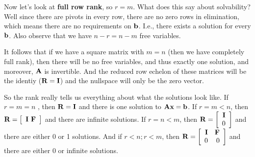 Now let's look at \textbf{full row rank}, so $r = m$. What does this say about solvability? Well since there are pivots in every row, there are no zero rows in elimination, which means there are no requirements on $\vb$. I.e., there exists a solution for every $\vb$. Also observe that we have $n-r=n-m$ free variables. 

It follows that if we have a square matrix with $m=n$ (then we have completely full rank), then there will be no free variables, and thus exactly one solution, and moreover, $\mA$ is invertible. And the reduced row echelon of these matrices will be the identiy ($\mR = \mI$) and the nullspace will only be the zero vector.  

So the rank really tells us everything about what the solutions look like. If $r = m = n$ , then $\mR = \mI$ and there is one solution to $\mA\vx = \vb$. If $r = m < n$, then $\mR = \mat{\mI\ \mF}$ and there are infinite solutions. If $r = n < m$, then $\mR = \mat{\mI \\ 0}$ and there are either 0 or 1 solutions. And if $r < n; r < m$, then $\mR = \mat{\mI&\mF\\0&0}$ and there are either 0 or infinite solutions.